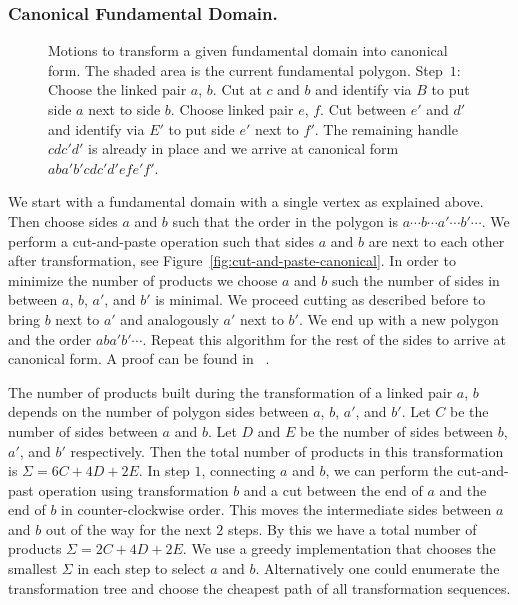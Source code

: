 \documentclass[Thesis.tex]{subfiles}
\begin{document}
\subsubsection*{Canonical Fundamental Domain.}

\begin{figure}
\centering
{}
\caption{Motions to transform a given fundamental domain into canonical form. The shaded area is the current fundamental polygon. Step~$1$: Choose the linked pair $a$, $b$. Cut at $c$ and $b$ and identify via $B$ to put side $a$ next to side $b$. Choose linked pair $e$, $f$. Cut between $e'$ and $d'$ and identify via $E'$ to put side $e'$ next to $f'$. The remaining handle $cdc'd'$ is already in place and we arrive at canonical form $aba'b'cdc'd'efe'f'$.}
\label{fig:canonical_algorithm}
\end{figure}

We start with a fundamental domain with a single vertex as explained above. Then choose sides $a$ and $b$ such that the order in the polygon is $a\cdots b \cdots a' \cdots b' \cdots$. We perform a cut-and-paste operation such that sides $a$ and $b$ are next to each other after transformation, see Figure~\ref{fig:cut-and-paste-canonical}. In order to minimize the number of products we choose $a$ and $b$ such the number of sides in between $a$, $b$, $a'$, and $b'$ is minimal. We proceed cutting as described before to bring $b$ next to $a'$ and analogously $a'$ next to $b'$. We end up with a new polygon and the order $aba'b'\cdots$. Repeat this algorithm for the rest of the sides to arrive at canonical form. A proof can be found in ~\cite{Jost2007}.

The number of products built during the transformation of a linked pair $a$, $b$ depends on the number of polygon sides between $a$, $b$, $a'$, and $b'$. Let $C$ be the number of sides between $a$ and $b$. Let $D$ and $E$ be the number of sides between $b$, $a'$, and $b'$ respectively. Then the total number of products in this transformation is $\Sigma=6C+4D+2E$. In step $1$, connecting $a$ and $b$, we can perform the cut-and-past operation using transformation $b$ and a cut between the end of $a$ and the end of $b$ in counter-clockwise order. This moves the intermediate sides between $a$ and $b$ out of the way for the next $2$ steps. By this we have a total number of products $\Sigma=2C+4D+2E$. We use a greedy implementation that chooses the smallest $\Sigma$ in each step to select $a$ and $b$. Alternatively one could enumerate the transformation tree and choose the cheapest path of all transformation sequences.
\end{document}
